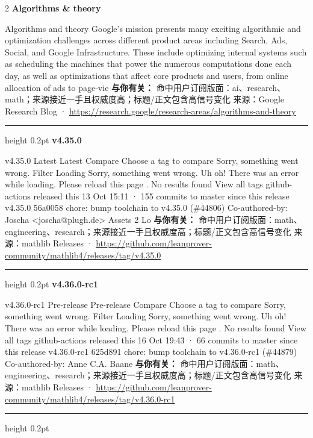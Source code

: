 \documentclass[10.5pt]{ctexart}
\begin{document}
\begin{multicols}{2}
{\large\bfseries Algorithms \& theory}\par
Algorithms and theory Google’s mission presents many exciting algorithmic and optimization challenges across different product areas including Search, Ads, Social, and Google Infrastructure. These include optimizing internal systems such as scheduling the machines that power the numerous computations done each day, as well as optimizations that affect core products and users, from online allocation of ads to page-vie
\textbf{与你有关：} 命中用户订阅版面：ai、research、math；来源接近一手且权威度高；标题/正文包含高信号变化
{\footnotesize\color{ormuted} 来源：Google Research Blog · \url{https://research.google/research-areas/algorithms-and-theory}}
\vspace{2mm}
\hrule height 0.2pt
\vspace{2mm}
{\large\bfseries v4.35.0}\par
v4.35.0 Latest Latest Compare Choose a tag to compare Sorry, something went wrong. Filter Loading Sorry, something went wrong. Uh oh! There was an error while loading. Please reload this page . No results found View all tags github-actions released this 13 Oct 15:11 · 155 commits to master since this release v4.35.0 56a0058 chore: bump toolchain to v4.35.0 (\#44806) Co-authored-by: Joscha <joscha@plugh.de> Assets 2 Lo
\textbf{与你有关：} 命中用户订阅版面：math、engineering、research；来源接近一手且权威度高；标题/正文包含高信号变化
{\footnotesize\color{ormuted} 来源：mathlib Releases · \url{https://github.com/leanprover-community/mathlib4/releases/tag/v4.35.0}}
\vspace{2mm}
\hrule height 0.2pt
\vspace{2mm}
{\large\bfseries v4.36.0-rc1}\par
v4.36.0-rc1 Pre-release Pre-release Compare Choose a tag to compare Sorry, something went wrong. Filter Loading Sorry, something went wrong. Uh oh! There was an error while loading. Please reload this page . No results found View all tags github-actions released this 16 Oct 19:43 · 66 commits to master since this release v4.36.0-rc1 625d891 chore: bump toolchain to v4.36.0-rc1 (\#44879) Co-authored-by: Anne C.A. Baane
\textbf{与你有关：} 命中用户订阅版面：math、engineering、research；来源接近一手且权威度高；标题/正文包含高信号变化
{\footnotesize\color{ormuted} 来源：mathlib Releases · \url{https://github.com/leanprover-community/mathlib4/releases/tag/v4.36.0-rc1}}
\vspace{2mm}
\hrule height 0.2pt

\end{multicols}
\end{document}
